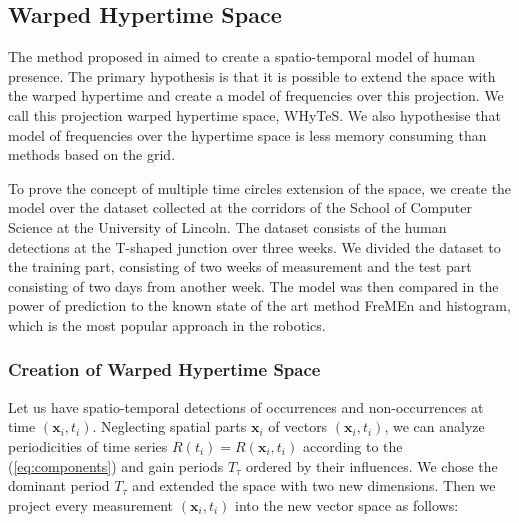 \subsection{Warped Hypertime Space}


The method proposed in \cite{Vintr2019Spatio} aimed to create a spatio-temporal model of human presence. 
The primary hypothesis is that it is possible to extend the space with the warped hypertime and create a model of frequencies over this projection.
We call this projection warped hypertime space, WHyTeS. 
We also hypothesise that model of frequencies over the hypertime space is less memory consuming than methods based on the grid.

To prove the concept of multiple time circles extension of the space, we create the model over the dataset collected at the corridors of the School of Computer Science at the University of Lincoln.
The dataset consists of the human detections at the T-shaped junction over three weeks.
We divided the dataset to the training part, consisting of two weeks of measurement and the test part consisting of two days from another week.
The model was then compared in the power of prediction to the known state of the art method FreMEn and histogram, which is the most popular approach in the robotics.

\subsubsection{Creation of Warped Hypertime Space}\label{sec:whytes}

Let us have spatio-temporal detections of occurrences and non-occurrences at time $\left(\mathbf{x}_i, t_i\right)$.
Neglecting spatial parts $\mathbf{x}_{i}$ of vectors $\left(\mathbf{x}_i, t_i\right)$, we can analyze periodicities of time series $R\left(t_{i}\right) = R\left(\mathbf{x}_i, t_i\right)$ according to the (\ref{eq:components}) and gain periods $T_{\tau}$ ordered by their influences.
We chose the dominant period $T_{\tau}$ and extended the space with two new dimensions.
Then we project every measurement $\left(\mathbf{x}_i, t_i\right)$ into the new vector space as follows:

